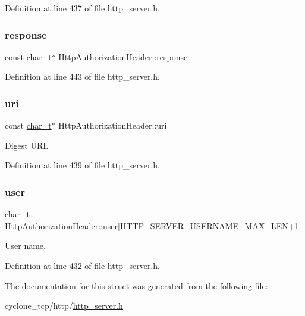 Definition at line 437 of file http\+\_\+server.\+h.

\mbox{\label{structHttpAuthorizationHeader_ab9af82caf503c954449395b5d3473d42}} 
\subsubsection{\texorpdfstring{response}{response}}
{\footnotesize\ttfamily const \hyperlink{compiler__port_8h_a40bb5262bf908c328fbcfbe5d29d0201}{char\+\_\+t}$\ast$ Http\+Authorization\+Header\+::response}



Definition at line 443 of file http\+\_\+server.\+h.

\mbox{\label{structHttpAuthorizationHeader_a50fc4f4b4c0adbc85cfbd93a31ff6cfa}} 
\subsubsection{\texorpdfstring{uri}{uri}}
{\footnotesize\ttfamily const \hyperlink{compiler__port_8h_a40bb5262bf908c328fbcfbe5d29d0201}{char\+\_\+t}$\ast$ Http\+Authorization\+Header\+::uri}



Digest U\+RI. 



Definition at line 439 of file http\+\_\+server.\+h.

\mbox{\label{structHttpAuthorizationHeader_aef9993b1c33a9664627f69962471772d}} 
\subsubsection{\texorpdfstring{user}{user}}
{\footnotesize\ttfamily \hyperlink{compiler__port_8h_a40bb5262bf908c328fbcfbe5d29d0201}{char\+\_\+t} Http\+Authorization\+Header\+::user\mbox{[}\hyperlink{http__server_8h_a8dad23eb13064267d7c9d5ffa2dca8fe}{H\+T\+T\+P\+\_\+\+S\+E\+R\+V\+E\+R\+\_\+\+U\+S\+E\+R\+N\+A\+M\+E\+\_\+\+M\+A\+X\+\_\+\+L\+EN}+1\mbox{]}}



User name. 



Definition at line 432 of file http\+\_\+server.\+h.



The documentation for this struct was generated from the following file\+:\begin{DoxyCompactItemize}
\item 
cyclone\+\_\+tcp/http/\hyperlink{http__server_8h}{http\+\_\+server.\+h}\end{DoxyCompactItemize}
